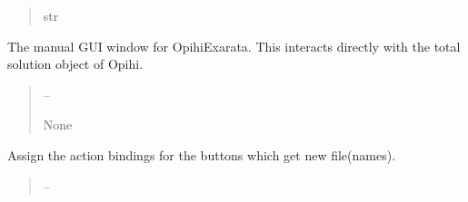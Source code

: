 \documentclass[letterpaper,11pt,english]{sphinxmanual}
\begin{document}
\begin{savenotes}
\begin{fulllineitems}
\begin{savenotes}
\begin{fulllineitems}
\begin{quote}
\begin{description}
\sphinxAtStartPar
str

\end{description}\end{quote}

\end{fulllineitems}\end{savenotes}


\begin{savenotes}\begin{fulllineitems}
\label{\detokenize{code/opihiexarata.gui.manual:opihiexarata.gui.manual.OpihiManualWindow.__init__}}
\pysigstartsignatures
{}
\pysigstopsignatures
\sphinxAtStartPar
The manual GUI window for OpihiExarata. This interacts directly
with the total solution object of Opihi.
\begin{quote}\begin{description}
\sphinxAtStartPar
{} – 

\sphinxAtStartPar
None

\end{description}\end{quote}

\end{fulllineitems}\end{savenotes}


\begin{savenotes}\begin{fulllineitems}
\label{\detokenize{code/opihiexarata.gui.manual:opihiexarata.gui.manual.OpihiManualWindow.__init_gui_connections}}
\pysigstartsignatures
{}
\pysigstopsignatures
\sphinxAtStartPar
Assign the action bindings for the buttons which get new
file(names).
\begin{quote}\begin{description}
\sphinxAtStartPar
{} – 


\end{description}
\end{quote}
\end{fulllineitems}
\end{savenotes}
\end{fulllineitems}
\end{savenotes}
\end{document}
